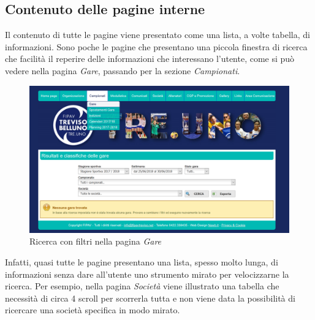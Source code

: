 	\subsection{Contenuto delle pagine interne}
	Il contenuto di tutte le pagine viene presentato come una lista, a volte tabella, 
	di informazioni. Sono poche le pagine che presentano una piccola finestra di 
	ricerca che facilità il reperire delle informazioni che interessano l'utente,
	come si può vedere nella pagina \textit{Gare}, passando per la sezione
	\textit{Campionati}.
	
	\begin{figure}[H]
	\centering
	\includegraphics[scale=0.6]{Images/ricerca.png}
	\caption{Ricerca con filtri nella pagina \textit{Gare}}
	\end{figure}
	
	Infatti, quasi tutte le pagine presentano una lista, spesso molto lunga, di 
	informazioni senza dare all'utente uno strumento mirato per velocizzarne la 
	ricerca. Per esempio, nella pagina \textit{Società} viene illustrato una tabella 
	che necessità di circa 4 scroll per scorrerla tutta e non viene data la
	possibilità di ricercare una società specifica in modo mirato.
	

